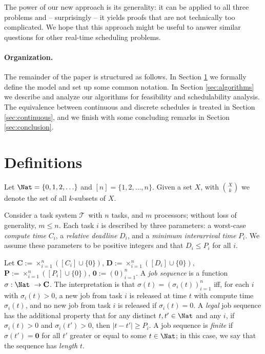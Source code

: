 \documentclass{llncs}
\newcommand{\tsys}{\ensuremath{\mathcal{T}}}
\newcommand{\seq}{\ensuremath{\sigma}}
\begin{document}
The power of our new approach is its generality: it can be applied to all three problems and -- surprisingly -- it yields proofs that are not technically too complicated. 
We hope that this approach might be useful to answer similar questions for other real-time scheduling problems. 



\paragraph{Organization.} The remainder of the paper is structured as follows. In Section \ref{sec:definitions} we formally define the model and set up some common notation. In Section \ref{sec:algorithms} we describe and analyze our algorithms for feasibility and schedulability analysis. The equivalence between continuous and discrete schedules is treated in Section \ref{sec:continuous}, and we finish with some concluding remarks in Section \ref{sec:conclusion}. 

\section{Definitions}
\label{sec:definitions}


Let $\Nat = \{0,1,2,\ldots\}$ and $[n]=\{1,2,\ldots,n\}$. 
Given a set $X$, with $\binom{X}{k}$ we denote the set of all $k$-subsets of $X$. 

Consider a task system \tsys\ with $n$ tasks, and $m$ processors; without loss of generality, $m \le n$. Each task $i$ is described by three parameters: a worst-case \emph{compute time} $C_i$, a \emph{relative deadline} $D_i$, and a \emph{minimum interarrival time} $P_i$. We assume these parameters to be positive integers and that $D_i \le P_i$ for all $i$.  


\newcommand{\rct}{\ensuremath{\mathbf{C}}}
\newcommand{\ttd}{\ensuremath{\mathbf{D}}}
\newcommand{\tta}{\ensuremath{\mathbf{P}}}
\newcommand{\zero}{\ensuremath{\mathbf{0}}}
\newcommand{\scheddec}{\ensuremath{\mathbf{S}}}
\newcommand{\alg}{\ensuremath{\mathrm{Alg}}}

Let $\rct := \times_{i=1}^n ([C_i] \cup \{0\})$, $\ttd := \times_{i=1}^n ([D_i] \cup \{0\})$, $\tta := \times_{i=1}^n ([P_i] \cup \{0\})$, $\zero := (0)_{i=1}^n$. 
A \emph{job sequence} is a function $\seq: \Nat\ \to \rct$. The interpretation is that $\seq(t) = (\seq_i(t))_{i=1}^n$ iff, for each $i$ with $\seq_i(t)>0$, a new job from task $i$ is released at time $t$ with compute time $\seq_i(t)$, and no new job from task $i$ is released if $\seq_i(t)=0$. A \emph{legal} job sequence has the additional property that for any distinct $t,t' \in \Nat$ and any $i$, if $\seq_i(t)>0$ and $\seq_i(t') > 0$, then $|t-t'| \ge P_i$. A job sequence is \emph{finite} if $\seq(t')=\zero$ for all $t'$ greater or equal to some $t \in \Nat$; in this case, we say that the sequence has \emph{length} $t$. 
\end{document}
